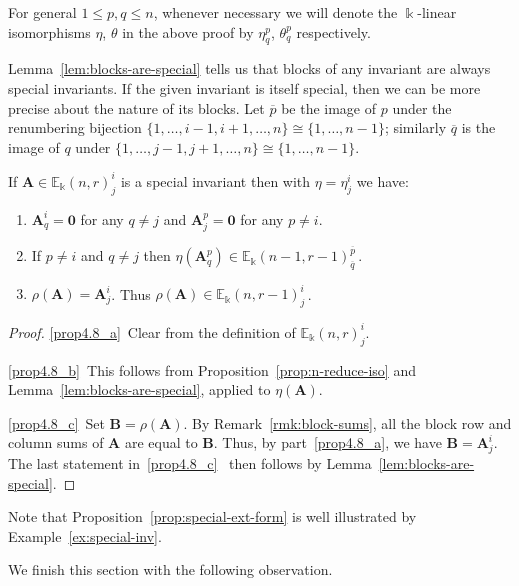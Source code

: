 \documentclass[ALCO,ThmDefs,Unicode,epreuves]{cedram}
\newcommand{\E}{\mathbb{E}}
\newcommand{\ov}{\overline}
\newcommand{\bA}{\mathbf{A}}
\newcommand{\bB}{\mathbf{B}}
\newcommand{\bzero}{\mathbf{0}}
\begin{document}
\begin{rema}\label{rmk:eta-theta}
For general $1 \le p,q \le n$, whenever necessary we
will denote the $\Bbbk$-linear isomorphisms $\eta$, $\theta$ in the
above proof by $\eta^p_q$, $\theta^p_q$ respectively. 
\end{rema}

Lemma~\ref{lem:blocks-are-special} tells us that blocks of any
invariant are always special invariants. If the given invariant is
itself special, then we can be more precise about the nature of its
blocks. Let $\ov{p}$ be the image of $p$ under the renumbering
bijection $\{1, \dots, i-1, i+1, \dots, n\} \cong \{1, \dots, n-1\}$;
similarly $\ov{q}$ is the image of $q$ under $\{1, \dots, j-1, j+1,
\dots, n\} \cong \{1, \dots, n-1\}$.

\begin{prop}\label{prop:special-ext-form}
 If $\bA \in \E_\Bbbk(n,r)^i_j$ is a special invariant then with
 $\eta = \eta^i_j$ we have:
 \begin{enumerate}[label=(\alph*)]
 \item\label{prop4.8_a} $\bA^i_q = \bzero$ for any $q \ne j$ and $\bA^p_j = \bzero$ for
 any $p \ne i$.
 \item\label{prop4.8_b} If $p \ne i$ and $q \ne j$ then $\eta(\bA^p_q) \in
 \E_\Bbbk(n-1,r-1)^{\ov{p}}_{\ov{q}}$\,. 
 \item\label{prop4.8_c} $\rho(\bA) = \bA^i_j$. Thus $\rho(\bA) \in
 \E_\Bbbk(n,r-1)^i_j$\,.
 \end{enumerate}
\end{prop}

\begin{proof}
\ref{prop4.8_a}~Clear from the definition of $\E_\Bbbk(n,r)^i_j$.

\ref{prop4.8_b}~This follows from Proposition~\ref{prop:n-reduce-iso} and Lemma~\ref{lem:blocks-are-special}, applied to $\eta(\bA)$.

\ref{prop4.8_c}~Set $\bB = \rho(\bA)$. By Remark~\ref{rmk:block-sums}, all the
 block row and column sums of $\bA$ are equal to $\bB$. Thus, by part~\ref{prop4.8_a}, 
 we have $\bB = \bA^i_j$. The last statement in~\ref{prop4.8_c}~ then follows
 by Lemma~\ref{lem:blocks-are-special}.
\end{proof}

Note that Proposition~\ref{prop:special-ext-form} is well illustrated
by Example~\ref{ex:special-inv}.



We finish this section with the following observation. 
\end{document}
